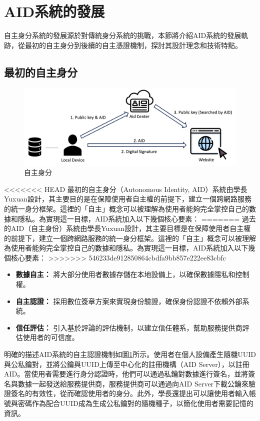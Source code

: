 \section{AID系統的發展}
自主身分系統的發展源於對傳統身分系統的挑戰，本節將介紹AID系統的發展軌跡，從最初的自主身分到後續的自主憑證機制，探討其設計理念和技術特點。
\subsection{最初的自主身分}
\begin{figure}
  \centering
  \includegraphics[width=\linewidth,keepaspectratio]{figures/old-aid.png}
  \caption{自主身分}
  \label{fig:old-aid}
\end{figure}
<<<<<<< HEAD
最初的自主身分（Autonomous Identity, AID）系統由學長Yuxuan\cite{ntu-lin2014autonomous}設計，其主要目的是在保障使用者自主權的前提下，建立一個跨網路服務的統一身分框架。這裡的「自主」概念可以被理解為使用者能夠完全掌控自己的數據和隱私。為實現這一目標，AID系統加入以下幾個核心要素：
=======
過去的AID（自主身份）系統由學長Yuxuan\cite{ntu-lin2014autonomous}設計，其主要目標是在保障使用者自主權的前提下，建立一個跨網路服務的統一身分框架。這裡的「自主」概念可以被理解為使用者能夠完全掌控自己的數據和隱私。為實現這一目標，AID系統加入以下幾個核心要素：
>>>>>>> 546233de912850864cbdfa9bb857e222ee83cbfc
\begin{itemize}
  \item \textbf{數據自主：} 將大部分使用者數據存儲在本地設備上，以確保數據隱私和控制權。
  \item \textbf{自主認證：} 採用數位簽章方案來實現身份驗證，確保身份認證不依賴外部系統。
  \item \textbf{信任評估：} 引入基於評論的評估機制，以建立信任體系，幫助服務提供商評估使用者的可信度。
\end{itemize}

明確的描述AID系統的自主認證機制如圖\ref{fig:old-aid}所示。使用者在個人設備產生隨機UUID與公私鑰對，並將公鑰與UUID上傳至中心化的註冊機構（AID Server），以註冊AID。當使用者需要進行身分認證時，他們可以通過私鑰對數據進行簽名，並將簽名與數據一起發送給服務提供商，服務提供商可以通過向AID Server下載公鑰來驗證簽名的有效性，從而確認使用者的身分。此外，學長還提出可以讓使用者輸入帳號與密碼作為配合UUID成為生成公私鑰對的隨機種子，以簡化使用者需要記憶的資訊。

